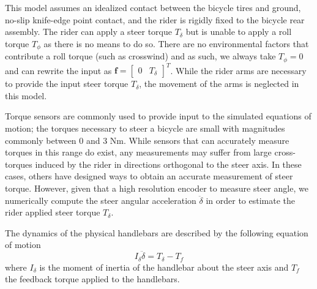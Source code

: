 \documentclass[11pt,a4paper,reqno]{amsart}
\newcommand{\roll}{\phi}
\newcommand{\steer}{\delta}
\begin{document}
This model assumes an idealized contact between the bicycle tires and ground, no-slip knife-edge point contact,
and the rider is rigidly fixed to the bicycle rear assembly.
The rider can apply a steer torque $ T_\steer $ but is unable to apply a roll torque $ T_\roll $ as there is no means to
do so.
There are no environmental factors that contribute a roll torque (such as crosswind) and as such,
we always take $ T_\roll = 0 $ and can rewrite the input as $ \bm{f} = \begin{bmatrix} 0  & T_\steer \end{bmatrix}^T $.
While the rider arms are necessary to provide the input steer torque $ T_\steer $, the movement of the arms is
neglected in this model.

Torque sensors are commonly used to provide input to the simulated equations of motion\cite{FIXME}; the torques
necessary to steer a bicycle are small with magnitudes commonly between 0 and 3 Nm\cite{moore2012}.
While sensors that can accurately measure torques in this range do exist, any measurements may suffer from large
cross-torques induced by the rider in directions orthogonal to the steer axis.
In these cases, others have designed ways to obtain an accurate measurement of steer torque\cite{moore2012}.
However, given that a high resolution encoder to measure steer angle, we numerically compute the steer
angular acceleration $ \ddot{\steer} $ in order to estimate the rider applied steer torque $ T_\steer $.

The dynamics of the physical handlebars are described by the following equation of motion
\begin{equation}
    I_\steer \ddot{\steer} = T_\steer- T_f
\end{equation}
where $ I_\steer $ is the moment of inertia of the handlebar about the steer axis and $ T_f $ the feedback torque
applied to the handlebars.
\end{document}
